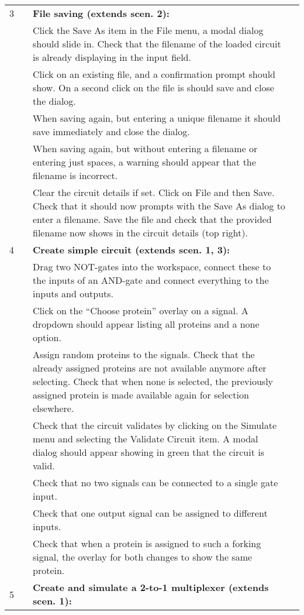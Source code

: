 \documentclass{article}
\newcounter{step}
\newcommand{\step}{\arabic{step}\stepcounter{step}}
\begin{document}
\begin{center}
\begin{longtable}{r r  p{} l }
3 & & \textbf{File saving (extends scen. 2):}\\
&\step& Click the Save As item in the File menu, a modal dialog should slide in. Check that the filename of the loaded circuit is already displaying in the input field.\\
&\step& Click on an existing file, and a confirmation prompt should show.
On a second click on the file is should save and close the dialog.\\
&\step& When saving again, but entering a unique filename it should save immediately and close the dialog.\\
&\step& When saving again, but without entering a filename or entering just spaces, a warning should appear that the filename is incorrect.\\
&\step& Clear the circuit details if set. Click on File and then Save. Check that it should now prompts with the Save As dialog to enter a filename. Save the file and check that the provided filename now shows in the circuit details (top right).\\ \midrule
4 &\setcounter{step}{1}& \textbf{Create simple circuit (extends scen. 1, 3):}\\
&\step& Drag two NOT-gates into the workspace, connect these to the inputs of an AND-gate and connect everything to the inputs and outputs.\\
&\step& Click on the ``Choose protein'' overlay on a signal. A dropdown should appear listing all proteins and a none option.\\
&\step& Assign random proteins to the signals. Check that the already assigned proteins are not available anymore after selecting. Check that when none is selected, the previously assigned protein is made available again for selection elsewhere.\\
&\step& Check that the circuit validates by clicking on the Simulate menu and selecting the Validate Circuit item. A modal dialog should appear showing in green that the circuit is valid.\\
&\step& Check that no two signals can be connected to a single gate input.\\
&\step& Check that one output signal can be assigned to different inputs.\\
&\step& Check that when a protein is assigned to such a forking signal, the overlay for both changes to show the same protein.\\ \midrule
5 &\setcounter{step}{1}& \textbf{Create and simulate a 2-to-1 multiplexer (extends scen. 1):}\\

\end{longtable}
\end{center}
\end{document}
